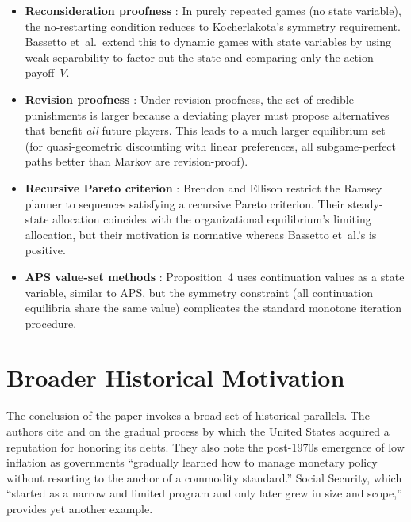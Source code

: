 \documentclass[12pt]{article}
\begin{document}
\begin{itemize}
  \item \textbf{Reconsideration proofness} \citep{kocherlakota1996reconsideration}:
    In purely repeated games (no state variable), the no-restarting condition
    reduces to Kocherlakota's symmetry requirement.  Bassetto et~al.\ extend
    this to dynamic games with state variables by using weak separability to
    factor out the state and comparing only the action payoff~$V$.

  \item \textbf{Revision proofness} \citep{asheim1997,alessleet2014}: Under
    revision proofness, the set of credible punishments is larger because a
    deviating player must propose alternatives that benefit \emph{all} future
    players.  This leads to a much larger equilibrium set (for quasi-geometric
    discounting with linear preferences, all subgame-perfect paths better than
    Markov are revision-proof).

  \item \textbf{Recursive Pareto criterion} \citep{brendonellison2018}: Brendon
    and Ellison restrict the Ramsey planner to sequences satisfying a recursive
    Pareto criterion.  Their steady-state allocation coincides with the
    organizational equilibrium's limiting allocation, but their motivation is
    normative whereas Bassetto et~al.'s is positive.

  \item \textbf{APS value-set methods} \citep{abreu1990}: Proposition~4 uses
    continuation values as a state variable, similar to APS, but the symmetry
    constraint (all continuation equilibria share the same value) complicates
    the standard monotone iteration procedure.
\end{itemize}


\section{Broader Historical Motivation}

The conclusion of the paper invokes a broad set of historical parallels.  The
authors cite \citet{sargent2017honoring} and
\citet{hallsargent2014,hallsargent2018} on the gradual process by which the
United States acquired a reputation for honoring its debts.  They also note the
post-1970s emergence of low inflation as governments ``gradually learned how to
manage monetary policy without resorting to the anchor of a commodity standard.''
Social Security, which ``started as a narrow and limited program and only later
grew in size and scope,'' provides yet another example.
\end{document}

